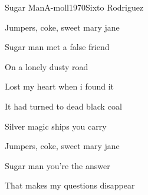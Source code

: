 \begin{song}{Sugar Man}{A-moll}{1970}{Sixto Rodriguez}{}{}
\begin{SBChorus}
    Jumpers, coke, sweet mary jane
  \end{SBChorus}

  \begin{SBVerse}
    Sugar man met a false friend

    On a lonely dusty road

    Lost my heart when i found it

    It had turned to dead black coal
  \end{SBVerse}

  \begin{SBChorus}
    Silver magic ships you carry

    Jumpers, coke, sweet mary jane
  \end{SBChorus}

  \begin{SBVerse}
    Sugar man you're the answer

    That makes my questions disappear
  \end{SBVerse}
\end{song}
